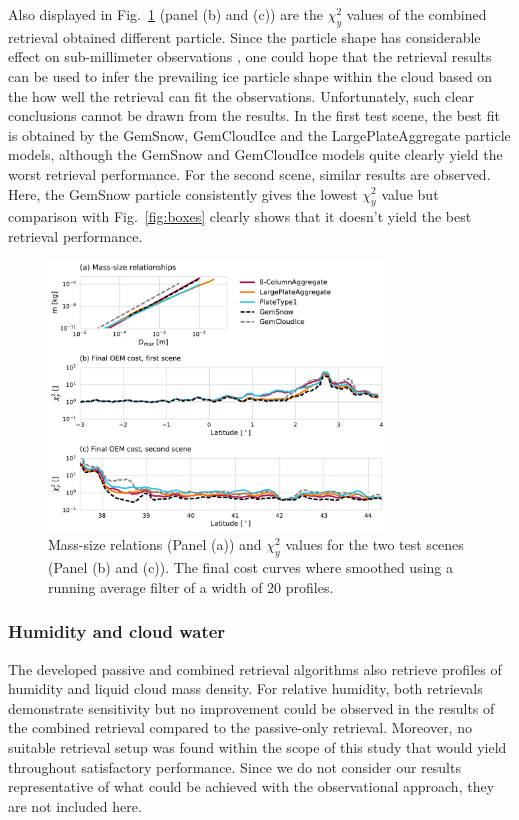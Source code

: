 \documentclass[journal abbreviation, manuscript]{copernicus}
\begin{document}
Also displayed in Fig.~\ref{fig:costs} (panel (b) and (c)) are the $\chi^2_y$
values of the combined retrieval obtained different particle. Since the particle
shape has considerable effect on sub-millimeter observations \citep{ekelund19},
one could hope that the retrieval results can be used to infer the prevailing
ice particle shape within the cloud based on the how well the retrieval can fit
the observations. Unfortunately, such clear conclusions cannot be drawn from the
results. In the first test scene, the best fit is obtained by the GemSnow,
GemCloudIce and the LargePlateAggregate particle models, although the GemSnow
and GemCloudIce models quite clearly yield the worst retrieval performance. For
the second scene, similar results are observed. Here, the GemSnow particle
consistently gives the lowest $\chi^2_y$ value but comparison with
Fig.~\ref{fig:boxes} clearly shows that it doesn't yield the best retrieval
performance.

\begin{figure}[!h]
\centering
\includegraphics[width = 0.8\textwidth]{../plots/costs}
\caption{Mass-size relations (Panel (a)) and $\chi^2_y$ values for the two test
  scenes (Panel (b) and (c)). The final cost curves where smoothed using a
  running average filter of a width of 20 profiles.}
\label{fig:costs}
\end{figure}


\subsubsection{Humidity and cloud water}

The developed passive and combined retrieval algorithms also retrieve profiles
of humidity and liquid cloud mass density. For relative humidity, both
retrievals demonstrate sensitivity but no improvement could be observed in the
results of the combined retrieval compared to the passive-only retrieval.
Moreover, no suitable retrieval setup was found within the scope of this study
that would yield throughout satisfactory performance. Since we do not consider
our results representative of what could be achieved with the observational
approach, they are not included here.
\end{document}
